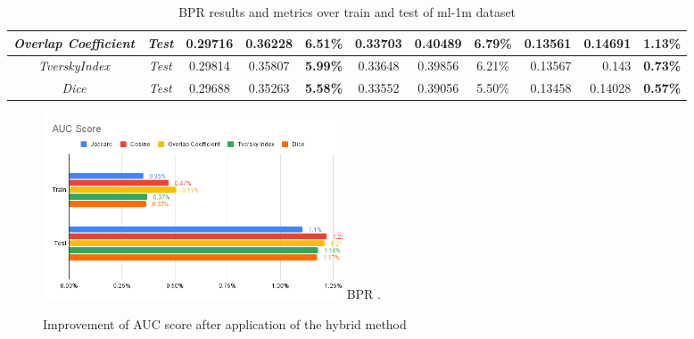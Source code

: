 \documentclass[journal]{IEEEtran}
\begin{document}
\begin{table}[bp]
{\begin{tabular}{|c|c|ccc|ccc|rrc|}
  \textit{Overlap Coefficient}                  & \textit{Test}                  & \multicolumn{1}{c|}{0.29716}        & \multicolumn{1}{c|}{0.36228}        & \cellcolor[HTML]{F3F3F3}\textbf{6.51\%} & \multicolumn{1}{c|}{0.33703}        & \multicolumn{1}{c|}{0.40489}        & 6.79\%       & \multicolumn{1}{r|}{0.13561}          & \multicolumn{1}{r|}{0.14691}          & \cellcolor[HTML]{F3F3F3}\textbf{1.13\%}                   \\ \hline
  \cellcolor[HTML]{FFFFFF}\textit{TverskyIndex} & \textit{Test}                  & \multicolumn{1}{c|}{0.29814}        & \multicolumn{1}{c|}{0.35807}        & \cellcolor[HTML]{F3F3F3}\textbf{5.99\%} & \multicolumn{1}{c|}{0.33648}        & \multicolumn{1}{c|}{0.39856}        & 6.21\%       & \multicolumn{1}{r|}{0.13567}          & \multicolumn{1}{r|}{0.143}            & \cellcolor[HTML]{F3F3F3}\textbf{0.73\%}                   \\ \hline
  \textit{Dice}                                 & \textit{Test}                  & \multicolumn{1}{c|}{0.29688}        & \multicolumn{1}{c|}{0.35263}        & \cellcolor[HTML]{F3F3F3}\textbf{5.58\%} & \multicolumn{1}{c|}{0.33552}        & \multicolumn{1}{c|}{0.39056}        & 5.50\%       & \multicolumn{1}{r|}{0.13458}          & \multicolumn{1}{r|}{0.14028}          & \cellcolor[HTML]{F3F3F3}\textbf{0.57\%}                   \\ \hline
  \end{tabular}%
  }
  \caption{BPR results and metrics over train and test of ml-1m dataset}
  \label{table:bpr_scores}
\end{table}

\begin{figure}[!t]
  \centering
  \includegraphics[width=3.5in]{picture/BPR-AUC-Score.png}
  BPR
  \DeclareGraphicsExtensions.
  \caption{Improvement of AUC score after application of the hybrid method}
  \label{fig:bpr_auc}
  \end{figure}
  
\end{document}

